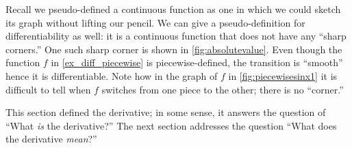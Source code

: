 Recall we pseudo-defined a continuous function as one in which we could sketch its graph without lifting our pencil. We can give a pseudo-definition for differentiability as well: it is a continuous function that does not have any ``sharp corners.'' One such sharp corner is shown in \autoref{fig:absolutevalue}. Even though the function $f$ in \autoref{ex_diff_piecewise} is piecewise-defined, the transition is ``smooth'' hence it is differentiable. Note how in the graph of $f$ in \autoref{fig:piecewisesinx1} it is difficult to tell when $f$ switches from one piece to the other; there is no ``corner.''


This section defined the derivative; in some sense, it answers the question of ``What \emph{is} the derivative?'' The next section addresses the question ``What does the derivative \emph{mean}?''



